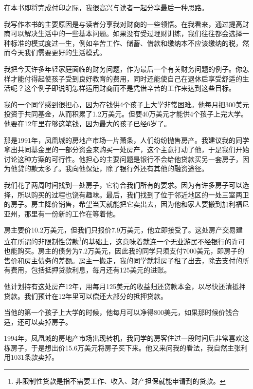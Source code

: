 
在本书即将完成付印之际，我很高兴与读者一起分享最后一种思路。

我写作本书的主要原因是与读者分享我对财商的一些领悟。在我看来，通过提高财商可以解决生活中的一些基本问题。如果没有受过理财训练，我们往往都会选择一种标准的模式度过一生，例如辛苦工作、储蓄、借款和缴纳本不应该缴纳的税，然而今天我们需要更好的生活模式。

我把今天许多年轻家庭面临的财务问题，作为最后一个有关财务问题的例子。你怎样才能付得起使孩子受到良好教育的费用，同时还能使自己在退休后享受舒适的生活呢？这个例子即说明怎样运用财商而不是凭借辛苦的工作来达到这些目标。

我的一个同学感到很担心，因为存钱供4个孩子上大学非常困难。他每月把300美元投资于共同基金，从而积累了1.2万美元。但要40万美元才能供4个孩子上完大学。他要在12年里存够这笔钱，因为最大的孩子已经6岁了。

那是1991年，凤凰城的房地产市场一片萧条，人们纷纷抛售房产。我建议我的同学拿出共同基金里的一部分资金来购买一处房产，这个主意打动了他，于是我们开始讨论这种方案的可行性。他担心的主要问题是银行不会给他贷款买另一套房子，因为他贷的款太多了。我向他保证，除了银行外还有其他的融资途径。

我们花了两周时间找到一处房子，它符合我们所有的要求。因为有许多房子可以选择，所以购买的过程也饶有趣味。最后，我们找到了位于邻近地区的一处三室两卫的房子。房主降价销售，希望当天就能把它卖出去，因为他和家人要搬到加利福尼亚州，那里有一份新的工作在等着他。

房主要价10.2万美元，但我们只报价7.9万美元，他立即接受了。这处房产交易建立在所谓的非限制性贷款\footnote{非限制性贷款是指不需要工作、收入、财产担保就能申请到的贷款。}的基础上，这意味着就连一个无业游民不经银行的许可也能购买。房主的债务为7.2万美元，因此我的同学只须支付7000美元，即房子的售价和房主债务的差额。房主一搬走，我的同学就将房子租了出去，除去支付的所有费用，包括抵押贷款利息，每月还有125美元的进账。

他计划持有这处房产12年，用每月125美元的收益归还贷款本金，以尽快还清抵押贷款。我们预计在12年里可以偿还大部分的抵押贷款。

当他的第一个孩子上大学的时候，他每月可以净得800美元，如果那时候价钱合适，还可以卖掉房子。

1994年，凤凰城的房地产市场出现转机，我同学的房客住过一段时间后非常喜欢这栋房子，于是想出价15.6万美元将房子买下来。他又来问我的看法，我自然主张利用1031条款卖掉。

